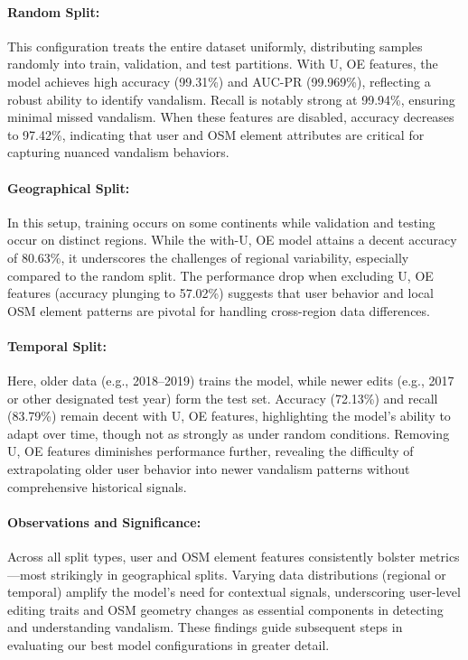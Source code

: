 \documentclass[
    13pt, %
    a4paper, %
    DIV14, %
    listof=totoc, %
    bibliography=totoc, %
    index=totoc, %
    headsepline
]{scrreprt}
\begin{document}
\paragraph{Random Split:}
This configuration treats the entire dataset uniformly, distributing samples randomly into train, validation, and test partitions. With U, OE features, the model achieves high accuracy (99.31\%) and AUC-PR (99.969\%), reflecting a robust ability to identify vandalism. Recall is notably strong at 99.94\%, ensuring minimal missed vandalism. When these features are disabled, accuracy decreases to 97.42\%, indicating that user and OSM element attributes are critical for capturing nuanced vandalism behaviors.

\paragraph{Geographical Split:}
In this setup, training occurs on some continents while validation and testing occur on distinct regions. While the with-U, OE model attains a decent accuracy of 80.63\%, it underscores the challenges of regional variability, especially compared to the random split. The performance drop when excluding U, OE features (accuracy plunging to 57.02\%) suggests that user behavior and local OSM element patterns are pivotal for handling cross-region data differences.

\paragraph{Temporal Split:}
Here, older data (e.g., 2018--2019) trains the model, while newer edits (e.g., 2017 or other designated test year) form the test set. Accuracy (72.13\%) and recall (83.79\%) remain decent with U, OE features, highlighting the model’s ability to adapt over time, though not as strongly as under random conditions. Removing U, OE features diminishes performance further, revealing the difficulty of extrapolating older user behavior into newer vandalism patterns without comprehensive historical signals.

\paragraph{Observations and Significance:}
Across all split types, user and OSM element features consistently bolster metrics—most strikingly in geographical splits. Varying data distributions (regional or temporal) amplify the model’s need for contextual signals, underscoring user-level editing traits and OSM geometry changes as essential components in detecting and understanding vandalism. These findings guide subsequent steps in evaluating our best model configurations in greater detail.
\end{document}
